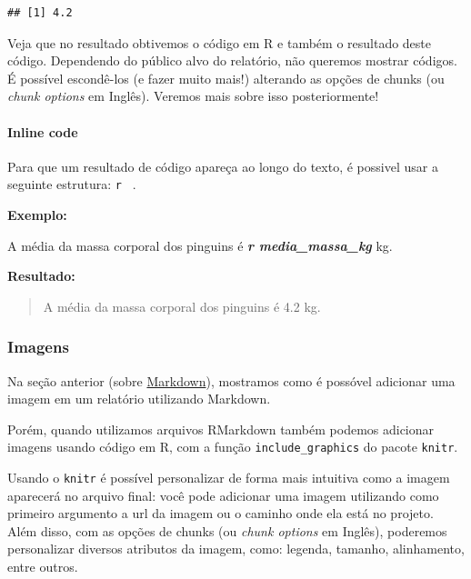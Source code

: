 \documentclass[
]{book}
\newenvironment{Shaded}{\begin{snugshade}}{\end{snugshade}}
\newcommand{\InformationTok}[1]{\textcolor[rgb]{0.56,0.35,0.01}{\textbf{\textit{#1}}}}
\newcommand{\NormalTok}[1]{#1}
\begin{document}
\begin{verbatim}
## [1] 4.2
\end{verbatim}

Veja que no resultado obtivemos o código em R e também o resultado deste código. Dependendo do público alvo do relatório, não queremos mostrar códigos. É possível escondê-los (e fazer muito mais!) alterando as opções de chunks (ou \emph{chunk options} em Inglês). Veremos mais sobre isso posteriormente!

\hypertarget{inline-code}{%
\paragraph*{Inline code}\label{inline-code}}

Para que um resultado de código apareça ao longo do texto, é possivel usar a seguinte estrutura: \texttt{\textasciigrave{}r\ \textasciigrave{}} .

\textbf{Exemplo:}

\begin{Shaded}
\begin{Highlighting}[]
\NormalTok{A média da massa corporal dos pinguins é }\InformationTok{\textasciigrave{}r media\_massa\_kg\textasciigrave{}}\NormalTok{ kg.}
\end{Highlighting}
\end{Shaded}

\textbf{Resultado:}

\begin{quote}
A média da massa corporal dos pinguins é 4.2 kg.
\end{quote}

\hypertarget{imagens-1}{%
\subsubsection{Imagens}\label{imagens-1}}

Na seção anterior (sobre \protect\hyperlink{markdown}{Markdown}), mostramos como é possóvel adicionar uma imagem em um relatório utilizando Markdown.

Porém, quando utilizamos arquivos RMarkdown também podemos adicionar imagens usando código em R, com a função \texttt{include\_graphics} do pacote \texttt{knitr}.

Usando o \texttt{knitr} é possível personalizar de forma mais intuitiva como a imagem aparecerá no arquivo final: você pode adicionar uma imagem utilizando como primeiro argumento a url da imagem ou o caminho onde ela está no projeto. Além disso, com as opções de chunks (ou \emph{chunk options} em Inglês), poderemos personalizar diversos atributos da imagem, como: legenda, tamanho, alinhamento, entre outros.
\end{document}
